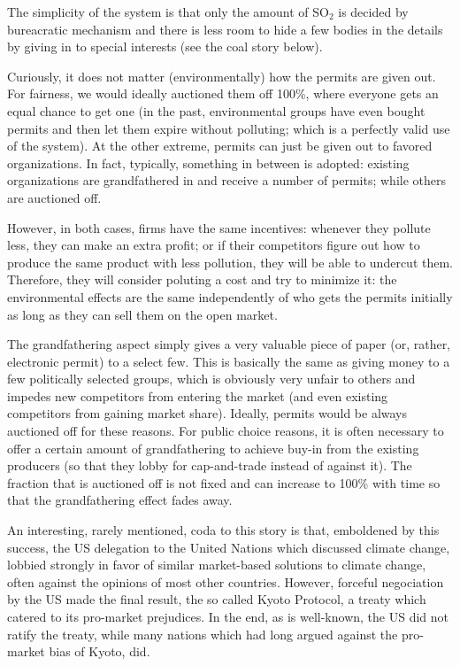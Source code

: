 The simplicity of the system is that only the amount of SO${}_2$ is decided by
bureacratic mechanism and there is less room to hide a few bodies in the
details by giving in to special interests (see the coal story below).

Curiously, it does not matter (environmentally) how the permits are given out.
For fairness, we would ideally auctioned them off 100\%, where everyone gets an
equal chance to get one (in the past, environmental groups have even bought
permits and then let them expire without polluting; which is a perfectly valid
use of the system). At the other extreme, permits can just be given out to
favored organizations. In fact, typically, something in between is adopted:
existing organizations are grandfathered in and receive a number of permits;
while others are auctioned off.

However, in both cases, firms have the same incentives: whenever they pollute
less, they can make an extra profit; or if their competitors figure out how to
produce the same product with less pollution, they will be able to undercut
them. Therefore, they will consider poluting a cost and try to minimize it: the
environmental effects are the same independently of who gets the permits
initially as long as they can sell them on the open market.

The grandfathering aspect simply gives a very valuable piece of paper (or,
rather, electronic permit) to a select few. This is basically the same as
giving money to a few politically selected groups, which is obviously very
unfair to others and impedes new competitors from entering the market (and even
existing competitors from gaining market share). Ideally, permits would be
always auctioned off for these reasons. For public choice reasons, it is often
necessary to offer a certain amount of grandfathering to achieve buy-in from
the existing producers (so that they lobby for cap-and-trade instead of against
it). The fraction that is auctioned off is not fixed and can increase to 100\%
with time so that the grandfathering effect fades away.

An interesting, rarely mentioned, coda to this story is that, emboldened by
this success, the US delegation to the United Nations which discussed climate
change, lobbied strongly in favor of similar market-based solutions to climate
change, often against the opinions of most other countries. However, forceful
negociation by the US made the final result, the so called Kyoto Protocol, a
treaty which catered to its pro-market prejudices. In the end, as is
well-known, the US did not ratify the treaty, while many nations which had long
argued against the pro-market bias of Kyoto, did.

